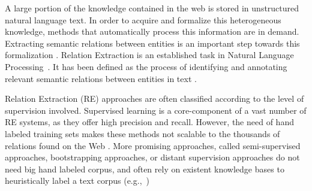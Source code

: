 
A large portion of the knowledge contained in the web is stored in unstructured natural language text. In order to acquire and formalize this heterogeneous knowledge, methods that automatically process this information are in demand. Extracting semantic relations between entities is an important step towards this formalization \citep{Wang2008}. Relation Extraction is an established task in Natural Language Processing~\citep{Bach2007}. It has been defined as the process of identifying and annotating relevant semantic relations between entities in text \citep{JiangZhai2007}. 

Relation Extraction (RE) approaches are often classified according to the level of supervision involved.
Supervised learning is a core-component of a vast number of RE systems, as they offer high precision and recall. However, the need of hand labeled training sets makes these methods not scalable to the thousands of relations found on the Web \citep{Hoffmann2011}.
More promising approaches, called semi-supervised approaches, bootstrapping approaches, or distant supervision approaches do not need big hand labeled corpus, and
often rely on existent knowledge bases to heuristically label a text corpus (e.g.,~\citep{Carlson2010,Hoffmann2011})

